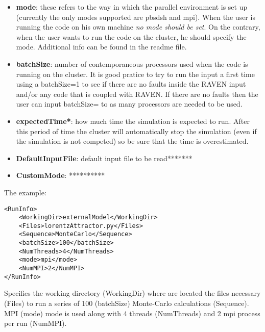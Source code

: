 \begin{itemize}
\item \textbf{mode}: these refers to the way in which the parallel environment is set up (currently the only modes supported are pbsdsh and mpi). When the user is running the code on his own machine \textit{no mode should be set}. On the contrary, when the user wants to run the code on the cluster, he should specify the mode. Additional info can be found in the readme file. 
\item \textbf{batchSize}: number of contemporaneous processors used when the code is running on the cluster. It is good pratice to try to run the input a first time using a batchSize=1 to see if there are no faults inside the RAVEN input and/or any code that is coupled with RAVEN. If there are no faults then the user can input batchSize= to as many processors are needed to be used.
\item \textbf{expectedTime*}: how much time the simulation is expected to run. After this period of time the cluster will automatically stop the simulation (even if the simulation is not competed) so be sure that the time is overestimated.
\item \textbf{DefaultInputFile}: default input file to be read*******
\item \textbf{CustomMode}: **********
\end{itemize}

The example:
\begin{lstlisting}[style=XML]
<RunInfo>
    <WorkingDir>externalModel</WorkingDir>
    <Files>lorentzAttractor.py</Files>
    <Sequence>MonteCarlo</Sequence>
    <batchSize>100</batchSize>
    <NumThreads>4</NumThreads>    
    <mode>mpi</mode>
    <NumMPI>2</NumMPI>
</RunInfo>
\end{lstlisting}
Specifies the working directory (WorkingDir) where are located the files necessary (Files) to run a series of 100 (batchSize) Monte-Carlo calculations (Sequence).
MPI (mode) mode is used along with 4 threads (NumThreads) and 2 mpi process per run (NumMPI).
